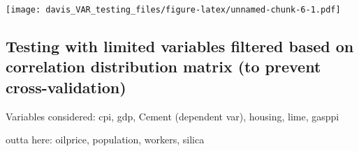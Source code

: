 \documentclass[
]{article}
\begin{document}
\texttt{[image: davis\_VAR\_testing\_files/figure-latex/unnamed-chunk-6-1.pdf]}

\hypertarget{testing-with-limited-variables-filtered-based-on-correlation-distribution-matrix-to-prevent-cross-validation}{%
\subsection{Testing with limited variables filtered based on correlation
distribution matrix (to prevent
cross-validation)}\label{testing-with-limited-variables-filtered-based-on-correlation-distribution-matrix-to-prevent-cross-validation}}

Variables considered: cpi, gdp, Cement (dependent var), housing, lime,
gasppi

outta here: oilprice, population, workers, silica
\end{document}
